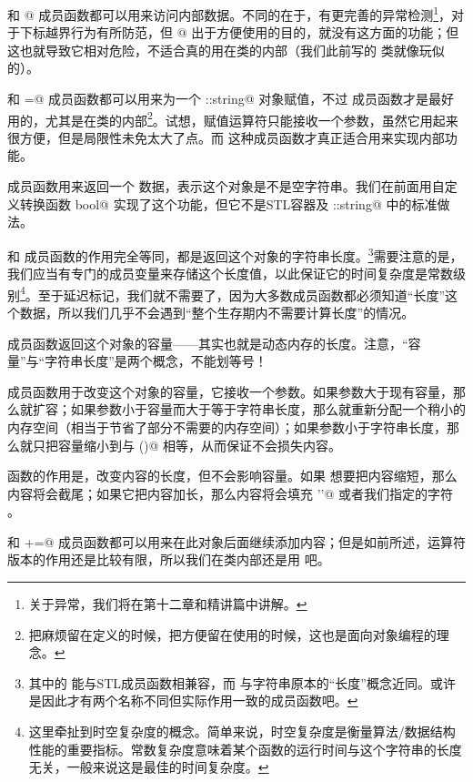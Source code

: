 \lstinline@at@ 和 \lstinline@operator[]@ 成员函数都可以用来访问内部数据。不同的在于，\lstinline@at@ 有更完善的异常检测\footnote{关于异常，我们将在第十二章和精讲篇中讲解。}，对于下标越界行为有所防范，但 \lstinline@operator[]@ 出于方便使用的目的，就没有这方面的功能；但这也就导致它相对危险，不适合真的用在类的内部（我们此前写的 \lstinline@valarri@ 类就像玩似的）。\par
\lstinline@assign@ 和 \lstinline@operator=@ 成员函数都可以用来为一个 \lstinline@std::string@ 对象赋值，不过 \lstinline@assign@ 成员函数才是最好用的，尤其是在类的内部\footnote{把麻烦留在定义的时候，把方便留在使用的时候，这也是面向对象编程的理念。}。试想，赋值运算符只能接收一个参数，虽然它用起来很方便，但是局限性未免太大了点。而 \lstinline@assign@ 这种成员函数才真正适合用来实现内部功能。\par
\lstinline@empty@ 成员函数用来返回一个 \lstinline@bool@ 数据，表示这个对象是不是空字符串。我们在前面用自定义转换函数 \lstinline@operator bool@ 实现了这个功能，但它不是STL容器及 \lstinline@std::string@ 中的标准做法。\par
\lstinline@size@ 和 \lstinline@length@ 成员函数的作用完全等同，都是返回这个对象的字符串长度。\footnote{其中的 \lstinline@size@ 能与STL成员函数相兼容，而 \lstinline@lengh@ 与字符串原本的``长度''概念近同。或许是因此才有两个名称不同但实际作用一致的成员函数吧。}需要注意的是，我们应当有专门的成员变量来存储这个长度值，以此保证它的时间复杂度是常数级别\footnote{这里牵扯到时空复杂度的概念。简单来说，时空复杂度是衡量算法/数据结构性能的重要指标。常数复杂度意味着某个函数的运行时间与这个字符串的长度无关，一般来说这是最佳的时间复杂度。}。至于延迟标记，我们就不需要了，因为大多数成员函数都必须知道``长度''这个数据，所以我们几乎不会遇到``整个生存期内不需要计算长度''的情况。\par
\lstinline@capacity@ 成员函数返回这个对象的容量——其实也就是动态内存的长度。注意，``容量''与``字符串长度''是两个概念，不能划等号！\par
\lstinline@reserve@ 成员函数用于改变这个对象的容量，它接收一个参数。如果参数大于现有容量，那么就扩容；如果参数小于容量而大于等于字符串长度，那么就重新分配一个稍小的内存空间（相当于节省了部分不需要的内存空间）；如果参数小于字符串长度，那么就只把容量缩小到与 \lstinline@size()@ 相等，从而保证不会损失内容。\par
\lstinline@resize@ 函数的作用是，改变内容的长度，但不会影响容量。如果 \lstinline@resize@ 想要把内容缩短，那么内容将会截尾；如果它把内容加长，那么内容将会填充 \lstinline@'\0'@ 或者我们指定的字符 \lstinline@ch@。\par
\lstinline@append@ 和 \lstinline@+=@ 成员函数都可以用来在此对象后面继续添加内容；但是如前所述，运算符版本的作用还是比较有限，所以我们在类内部还是用 \lstinline@append@ 吧。\par
